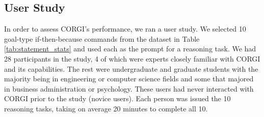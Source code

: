 
\vspace{-0.5em}
\subsection{User Study}
% 

In order to assess CORGI's performance, %
we ran a user study. We selected 10 goal-type if-then-because commands from the dataset in Table \ref{tab:statement_stats} and used each as the prompt for a reasoning task.
We had 28 participants
in the study, 4 of which were experts closely familiar with CORGI and its capabilities. The rest were undergraduate and graduate students with the majority being in engineering or computer science fields and some that majored in business administration or psychology. These users had never interacted with CORGI prior to the study (novice users).
Each person was issued the 10 reasoning tasks, taking on average 20 minutes to complete all 10. 

